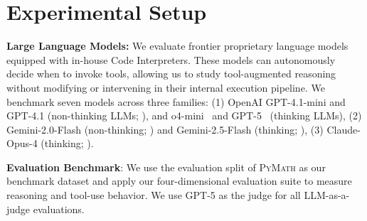\documentclass[11pt]{article}
\def \dataset{\textsc{PyMath}\xspace}
\def \task{\textsc{TIM}\xspace}
\newcommand{\pouya}[1]{{\color{violet}Pouya: #1}}
\begin{document}



\section{Experimental Setup}
\label{sec:experimental_setup}
\textbf{Large Language Models:} We evaluate frontier proprietary language models equipped with in-house Code Interpreters. These models can autonomously decide when to invoke tools, allowing us to study tool-augmented reasoning without modifying or intervening in their internal execution pipeline.
% 
We benchmark seven models across three families:
(1) OpenAI GPT-4.1-mini and GPT-4.1 (non-thinking LLMs; \citealp{gpt4.1}), and o4-mini~\citep{o4-mini-model} and GPT-5~\citep{gpt5} (thinking LLMs), (2) Gemini-2.0-Flash (non-thinking; \citealp{gemini-2-model}) and Gemini-2.5-Flash (thinking; \citealp{gemini2.5-flash}), (3) Claude-Opus-4 (thinking; \citealp{claudeopus4andsonnet4}).
% 

\noindent
\textbf{Evaluation Benchmark}: We use the evaluation split of \dataset as our benchmark dataset and apply our four-dimensional evaluation suite to measure reasoning and tool-use behavior. 
We use GPT-5 as the judge for all LLM-as-a-judge evaluations.
\end{document}
